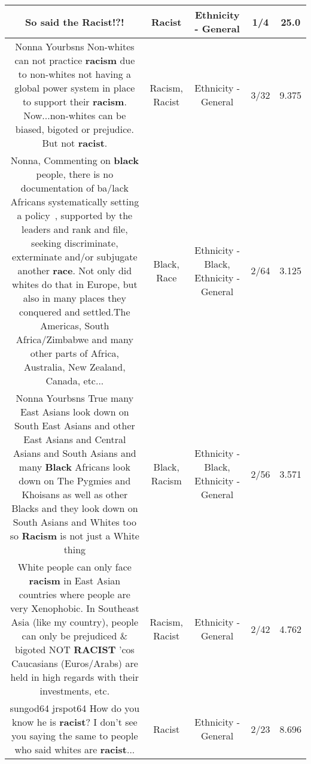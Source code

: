 \documentclass[11pt]{article}
\newlength\mylength
\begin{document}
\begin{center}
\begin{longtable}{|C{.65\mylength}|C{.30\mylength}|C{.12\mylength}|C{.12\mylength}|C{.12\mylength}|}
  \small So said the \textbf{Racist}!?!\normalsize   & Racist & Ethnicity - General & 1/4 & 25.0 \\  \hline
  \small Nonna Yourbsns Non-whites can not practice \textbf{racism} due to non-whites not having a global power system in place to support their \textbf{racism}. Now...non-whites can be biased, bigoted or prejudice. But not \textbf{racist}.\normalsize   & Racism, Racist & Ethnicity - General & 3/32 & 9.375 \\  \hline
  \small Nonna, Commenting on \textbf{black} people, there is no documentation of ba/lack Africans systematically setting a policy , supported by the leaders and rank and file, seeking  discriminate, exterminate  and/or subjugate another \textbf{race}.  Not only did whites do that in Europe, but also in many places they conquered and settled.The Americas, South Africa/Zimbabwe and many other parts of Africa, Australia, New Zealand, Canada, etc...\normalsize   & Black, Race & Ethnicity - Black, Ethnicity - General & 2/64 & 3.125 \\  \hline
  \small Nonna Yourbsns True many East Asians look down on South East Asians and other East Asians and Central Asians and South Asians and many \textbf{Black} Africans look down on The Pygmies and Khoisans as well as other Blacks and they look down on South Asians and Whites too so \textbf{Racism} is not just a White thing\normalsize   & Black, Racism & Ethnicity - Black, Ethnicity - General & 2/56 & 3.571 \\  \hline
  \small White people can only face \textbf{racism} in East Asian countries where people are very Xenophobic. In Southeast Asia (like my country), people can only be prejudiced \& bigoted NOT \textbf{RACIST} 'cos Caucasians (Euros/Arabs) are held in high regards with their investments, etc.\normalsize   & Racism, Racist & Ethnicity - General & 2/42 & 4.762 \\  \hline
  \small sungod64 jrspot64 How do you know he is \textbf{racist}? I don't see you saying the same to people who said whites are \textbf{racist}...\normalsize   & Racist & Ethnicity - General & 2/23 & 8.696 \\  \hline

\end{longtable}
\end{center}
\end{document}
